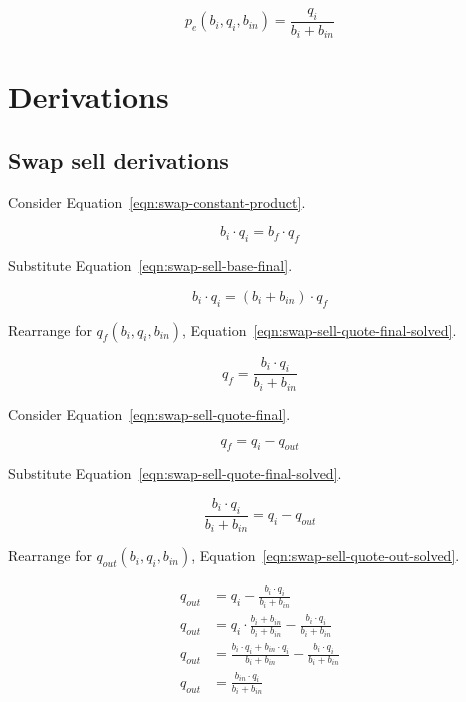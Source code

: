 \documentclass[table, twocolumn]{article}
\begin{document}
\begin{equation}\label{eqn:swap-sell-execution-price-solved}
	p_e (b_i, q_i, b_{in}) = \frac{q_i}{b_i + b_{in}}
\end{equation}

\section{Derivations}\label{sec:derivations}

\subsection{Swap sell derivations}\label{ssec:swap-sell-derivations}

Consider Equation~\ref{eqn:swap-constant-product}.

\begin{equation}
	b_i \cdot q_i = b_f \cdot q_f \nonumber
\end{equation}

Substitute Equation~\ref{eqn:swap-sell-base-final}.

\begin{equation}
	b_i \cdot q_i = (b_i + b_{in}) \cdot q_f \nonumber
\end{equation}

Rearrange for $q_f(b_i, q_i, b_{in})$,
Equation~\ref{eqn:swap-sell-quote-final-solved}.

\begin{equation}
	q_f = \frac{b_i \cdot q_i}{b_i + b_{in}} \nonumber
\end{equation}

Consider Equation~\ref{eqn:swap-sell-quote-final}.

\begin{equation}
	q_f = q_i - q_{out} \nonumber
\end{equation}

Substitute Equation~\ref{eqn:swap-sell-quote-final-solved}.

\begin{equation}
	\frac{b_i \cdot q_i}{b_i + b_{in}}= q_i - q_{out} \nonumber
\end{equation}

Rearrange for $q_{out}(b_i, q_i, b_{in})$,
Equation~\ref{eqn:swap-sell-quote-out-solved}.

\begin{align}
	q_{out} & = q_i - \frac{b_i \cdot q_i}{b_i + b_{in}} \nonumber \\
	q_{out} & = q_i \cdot \frac{b_i + b_{in}}{b_i + b_{in}} -
  \frac{b_i \cdot q_i}{b_i + b_{in}} \nonumber \\
	q_{out} & = \frac{b_i \cdot q_i + b_{in} \cdot q_i }{b_i + b_{in}} -
  \frac{b_i \cdot q_i}{b_i + b_{in}} \nonumber \\
	q_{out} & = \frac{b_{in} \cdot q_i }{b_i + b_{in}} \nonumber
\end{align}
\end{document}
